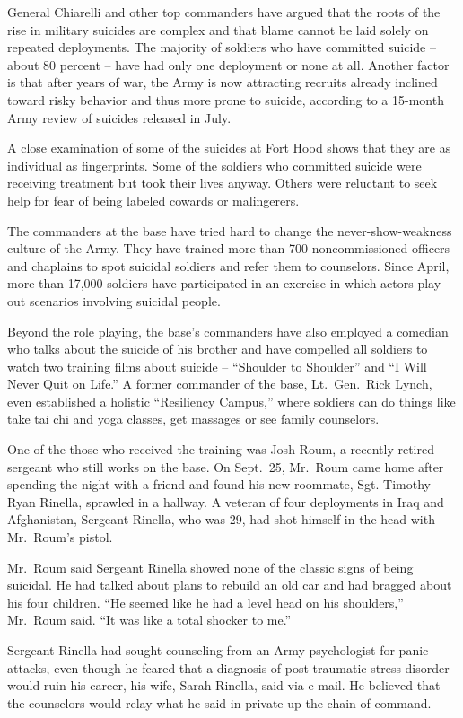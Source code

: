 ﻿\documentclass[12pt]{article}
\begin{document}
General Chiarelli and other top commanders have argued that the roots of the rise in military
suicides are complex and that blame cannot be laid solely on repeated deployments. The majority of
soldiers who have committed suicide -- about 80 percent -- have had only one deployment or none at
all. Another factor is that after years of war, the Army is now attracting recruits already inclined
toward risky behavior and thus more prone to suicide, according to a 15-month Army review of
suicides released in July.

A close examination of some of the suicides at Fort Hood shows that they are as individual as
fingerprints. Some of the soldiers who committed suicide were receiving treatment but took their
lives anyway. Others were reluctant to seek help for fear of being labeled cowards or malingerers.

The commanders at the base have tried hard to change the never-show-weakness culture of the Army.
They have trained more than 700 noncommissioned officers and chaplains to spot suicidal soldiers and
refer them to counselors. Since April, more than 17,000 soldiers have participated in an exercise in
which actors play out scenarios involving suicidal people.

Beyond the role playing, the base's commanders have also employed a comedian who talks about the
suicide of his brother and have compelled all soldiers to watch two training films about suicide --
``Shoulder to Shoulder'' and ``I Will Never Quit on Life.'' A former commander of the base,
Lt.~Gen.~Rick Lynch, even established a holistic ``Resiliency Campus,'' where soldiers can do things
like take tai chi and yoga classes, get massages or see family counselors.

One of the those who received the training was Josh Roum, a recently retired sergeant who still
works on the base. On Sept.~25, Mr.~Roum came home after spending the night with a friend and found
his new roommate, Sgt. Timothy Ryan Rinella, sprawled in a hallway. A veteran of four deployments in
Iraq and Afghanistan, Sergeant Rinella, who was 29, had shot himself in the head with Mr.~Roum's
pistol.

Mr.~Roum said Sergeant Rinella showed none of the classic signs of being suicidal. He had talked
about plans to rebuild an old car and had bragged about his four children. ``He seemed like he had a
level head on his shoulders,'' Mr.~Roum said. ``It was like a total shocker to me.''

Sergeant Rinella had sought counseling from an Army psychologist for panic attacks, even though he
feared that a diagnosis of post-traumatic stress disorder would ruin his career, his wife, Sarah
Rinella, said via e-mail. He believed that the counselors would relay what he said in private up the
chain of command.
\end{document}
